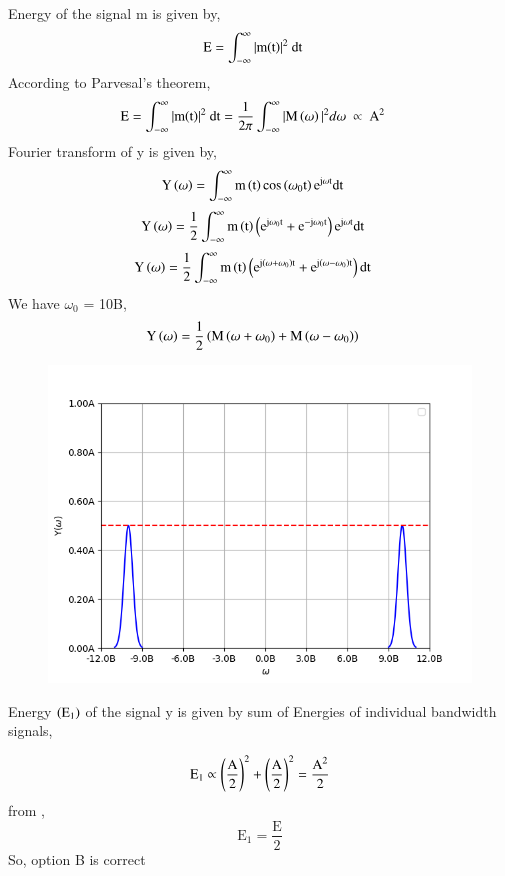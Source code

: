 \documentclass[beamer]{IEEEtran}
\theoremstyle{remark}
\begin{document}
Energy  of the signal m is given by,
\begin{align}
    \text{E}&=\int_{-\infty}^{\infty}|\text{m\brak{\text{t}}}|^2\ \text{dt}
\end{align}
According to Parvesal's theorem,
\begin{align}
\label{2}
    \text{E}&=\int_{-\infty}^{\infty}|\text{m\brak{\text{t}}}|^2\ \text{dt}=\frac{1}{2\pi}\int_{-\infty}^{\infty}|\text{M}\brak{\omega}|^2d\omega\ \propto\ \text{A}^2
\end{align}
Fourier transform of y is given by,
\begin{align}
\text{Y}\left(\omega\right)&=\int_{-\infty}^{\infty}\text{m}\left(\text{t}\right)\text{cos}\left(\omega_0\text{t}\right)\text{e}^{\text{j}\omega\text{t}}\text{dt}
\end{align}
\begin{align}
\text{Y}\left(\omega\right)&=\frac{1}{2}\int_{-\infty}^{\infty}\text{m}\left(\text{t}\right)\left(\text{e}^{\text{j}\omega_0\text{t}}+\text{e}^{-\text{j}\omega_0\text{t}}\right)\text{e}^{\text{j}\omega\text{t}}\text{dt}
\end{align}
\begin{align}
\text{Y}\left(\omega\right)&=\frac{1}{2}\int_{-\infty}^{\infty}\text{m}\left(\text{t}\right)\left(\text{e}^{\text{j}\left(\omega+\omega_0\right)\text{t}}+\text{e}^{\text{j}\left(\omega-\omega_0\right)\text{t}}\right)\text{dt}
\end{align}
We have $\omega_0$ = 10B,
\begin{align}
\label{1}
\text{Y}\left(\omega\right)&=\frac{1}{2}\left(\text{M}\left(\omega+\omega_0\right)+\text{M}\left(\omega-\omega_0\right)\right)
\end{align}

\begin{figure}[h]
    \centering
    \includegraphics[scale=0.50]{figs/ec,27(1).png}
    \label{fig:enter-label}
\end{figure}

Energy $\left(\text{E}_1\right)$ of the signal y is given by sum of Energies of individual bandwidth signals,

$$\text{E}_1\propto \left(\frac{\text{A}}{2}\right)^2+\left(\frac{\text{A}}{2}\right)^2=\frac{\text{A}^2}{2}$$
from \brak{\ref{2}},\\
$$\text{E}_1=\frac{\text{E}}{2}$$
So, option B is correct
\end{document}
